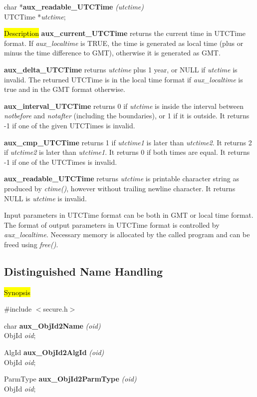 char *{\bf aux\_readable\_UTCTime} {\em (utctime)} \\
UTCTime *{\em utctime}; 

\hl{Description}
{\bf aux\_current\_UTCTime} returns the current time in UTCTime format. If
{\em aux\_localtime} is TRUE, the time is generated as local time (plus
or minus the time difference to GMT), otherwise it is generated as GMT.

{\bf aux\_delta\_UTCTime} returns {\em utctime} plus 1 year, or NULL if
{\em utctime} is invalid. The returned UTCTime is in the local time format
if {\em aux\_localtime} is true and in the GMT format otherwise. 

{\bf aux\_interval\_UTCTime} returns 0 if {\em utctime} is inside the interval
between {\em notbefore} and {\em notafter} (including the boundaries), or 1 if
it is outside. It returns -1 if one of the given UTCTimes is invalid.

{\bf aux\_cmp\_UTCTime} returns 1 if {\em utctime1} is later than {\em utctime2}.
It returns 2 if {\em utctime2} is later than {\em utctime1}. It returns 0
if both times are equal. It returns -1 if one of the UTCTimes is invalid.

{\bf aux\_readable\_UTCTime} returns {\em utctime} is printable character string
as produced by {\em ctime()}, however without trailing newline character. It
returns NULL is {\em utctime} is invalid.

Input parameters in UTCTime format can be both in GMT or local time format. The
format of output parameters in UTCTime format is controlled by {\em aux\_localtime}.
Necessary memory is allocated by the called program and can be freed using
{\em free()}.

\subsection{Distinguished Name Handling}
\label{aux_aid}
\hl{Synopsis}

\#include $<$secure.h$>$ 

char {\bf *aux\_ObjId2Name} {\em (oid)} \\
ObjId {\em *oid};

AlgId {\bf *aux\_ObjId2AlgId} {\em (oid)}  \\
ObjId {\em *oid};

ParmType {\bf aux\_ObjId2ParmType} {\em (oid)} \\
ObjId {\em *oid};

